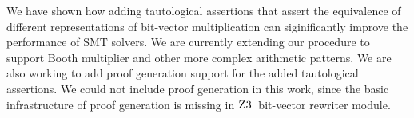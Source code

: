 We have shown how adding tautological assertions that assert the
equivalence of different representations of bit-vector multiplication
can siginificantly improve the performance of SMT solvers.  We are
currently extending our procedure to support Booth multiplier and
other more complex arithmetic patterns.  We are also working to add
proof generation support for the added tautological assertions.  We
could not include proof generation in this work, since the basic
infrastructure of proof generation is missing in $\textsc{Z3}$~bit-vector
rewriter module.
%






